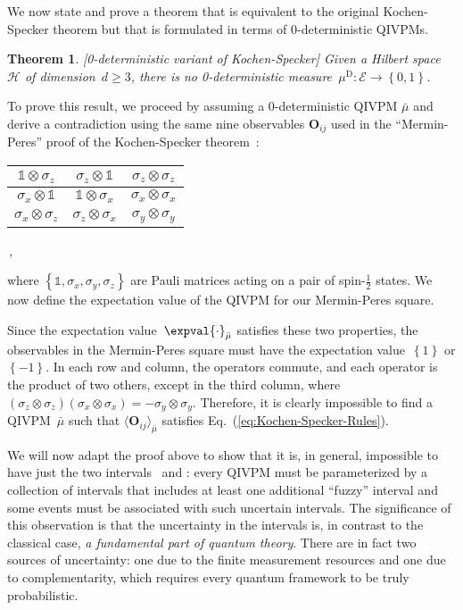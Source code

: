 \documentclass[english,reprint, aps, prl,superscriptaddress, showpacs,
showkeys, longbibliography, amsmath, amssymb]{revtex4-1}
\theoremstyle{plain}
\newtheorem{thm}{Theorem}
\theoremstyle{definition}
\newcommand{\Hilb}{\mathcal{H}}
\newcommand{\events}{\ensuremath{\mathcal{E}}}
\newcommand{\imposs}{{\text{\wesa{impossible}}}}
\newcommand{\necess}{{\text{\wesa{certain}}}}
\begin{document}
We now state and prove a theorem that is equivalent to the original
Kochen-Specker theorem but that is formulated in terms of
$0$-deterministic QIVPMs. 


\begin{thm}
\label{thm:Kochen-Specker} {\rm [0-deterministic variant of Kochen-Specker]}
Given a Hilbert space $\Hilb$ of dimension~$d\ge3$, there is no
0-deterministic
measure~$\mu^{\mathrm{D}}:\events\rightarrow\left\{ 0,1\right\}$.
\end{thm}

To prove this result, we proceed by assuming a 0-deterministic QIVPM
$\bar{\mu}$ and derive a contradiction using the same nine observables
$\mathbf{O}_{ij}$ used in the ``Mermin-Peres'' proof of the
Kochen-Specker theorem~\cite{Mermin1990Simple,peres1995quantum}:
{\renewcommand{\arraystretch}{2}%
\begin{center}
\begin{tabular}{|@{\quad}c@{\quad}|@{\quad}c@{\quad}|@{\quad}c@{\quad}|}
\hline 
$\mathbb{1}\otimes\sigma_{z}$  & $\sigma_{z}\otimes\mathbb{1}$  & $\sigma_{z}\otimes\sigma_{z}$ \tabularnewline
\hline 
$\sigma_{x}\otimes\mathbb{1}$  & $\mathbb{1}\otimes\sigma_{x}$  & $\sigma_{x}\otimes\sigma_{x}$ \tabularnewline
\hline 
$\sigma_{x}\otimes\sigma_{z}$  & $\sigma_{z}\otimes\sigma_{x}$  & $\sigma_{y}\otimes\sigma_{y}$ \tabularnewline
\hline 
\end{tabular}\,,
\par\end{center}
}
\noindent where $\left\{\mathbb{1},\sigma_{x},\sigma_{y},\sigma_{z}\right\}$ are
Pauli matrices acting on a pair of spin-$\frac{1}{2}$ states. We now define the
expectation value of the QIVPM for our Mermin-Peres square.

Since the expectation value~$\expval{\cdot}_{\bar{\mu}}$ satisfies
these two properties, the observables in the Mermin-Peres square must
have the expectation value~$\left\{ 1\right\} $ or
$\left\{ -1\right\} $.  In each row and column, the operators commute,
and each operator is the product of two others, except in the third
column, where
$\left(\sigma_{z}\otimes\sigma_{z}\right)\left(\sigma_{x}\otimes\sigma_{x}\right)=-\sigma_{y}\otimes\sigma_{y}$.
Therefore, it is clearly impossible to find a QIVPM~$\bar{\mu}$ such
that $\langle \mathbf{O}_{ij}\rangle_{\bar \mu}$ satisfies
Eq.~(\ref{eq:Kochen-Specker-Rules}).
 
We will now adapt the proof above to show that it is, in general,
impossible to have just the two intervals \imposs\ and \necess: every
QIVPM must be parameterized by a collection of intervals that includes
at least one additional ``fuzzy'' interval and some events must be
associated with such uncertain intervals. The significance of this
observation is that the uncertainty in the intervals is, in contrast
to the classical case, \emph{a fundamental part of quantum
  theory}. There are in fact two sources of uncertainty: one due to
the finite measurement resources and one due to complementarity, which
requires every quantum framework to be truly probabilistic.
\end{document}
